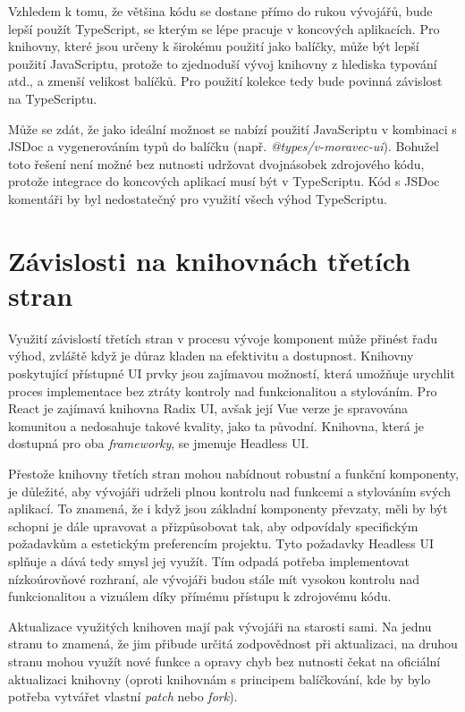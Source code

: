 Vzhledem k tomu, že většina kódu se dostane přímo do rukou vývojářů, bude lepší použít TypeScript, se kterým se lépe pracuje v koncových aplikacích. Pro knihovny, které jsou určeny k širokému použití jako balíčky, může být lepší použití JavaScriptu, protože to zjednoduší vývoj knihovny z hlediska typování atd., a zmenší velikost balíčků. Pro použití kolekce tedy bude povinná závislost na TypeScriptu.

Může se zdát, že jako ideální možnost se nabízí použití JavaScriptu v kombinaci s JSDoc a vygenerováním typů do balíčku (např. \emph{@types/v-moravec-ui}). Bohužel toto řešení není možné bez nutnosti udržovat dvojnásobek zdrojového kódu, protože integrace do koncových aplikací musí být v TypeScriptu. Kód s JSDoc komentáři by byl nedostatečný pro využití všech výhod TypeScriptu.

\section{Závislosti na knihovnách třetích stran}
Využití závislostí třetích stran v procesu vývoje komponent může přinést řadu výhod, zvláště když je důraz kladen na efektivitu a dostupnost. Knihovny poskytující přístupné UI prvky jsou zajímavou možností, která umožňuje urychlit proces implementace bez ztráty kontroly nad funkcionalitou a stylováním. Pro React je zajímavá knihovna Radix UI, avšak její Vue verze je spravována komunitou a nedosahuje takové kvality, jako ta původní. Knihovna, která je dostupná pro oba \emph{frameworky}, se jmenuje Headless UI.

Přestože knihovny třetích stran mohou nabídnout robustní a funkční komponenty, je důležité, aby vývojáři udrželi plnou kontrolu nad funkcemi a stylováním svých aplikací. To znamená, že i když jsou základní komponenty převzaty, měli by být schopni je dále upravovat a přizpůsobovat tak, aby odpovídaly specifickým požadavkům a estetickým preferencím projektu. Tyto požadavky Headless UI splňuje a dává tedy smysl jej využít. Tím odpadá potřeba implementovat nízkoúrovňové rozhraní, ale vývojáři budou stále mít vysokou kontrolu nad funkcionalitou a vizuálem díky přímému přístupu k zdrojovému kódu.

Aktualizace využitých knihoven mají pak vývojáři na starosti sami. Na jednu stranu to znamená, že jim přibude určitá zodpovědnost při aktualizaci, na druhou stranu mohou využít nové funkce a opravy chyb bez nutnosti čekat na oficiální aktualizaci knihovny (oproti knihovnám s principem balíčkování, kde by bylo potřeba vytvářet vlastní \emph{patch} nebo \emph{fork}).

